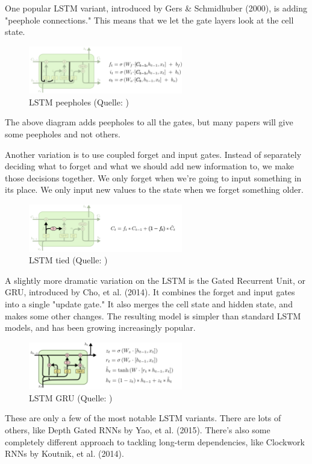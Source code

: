 {One popular LSTM variant, introduced by Gers \& Schmidhuber (2000), is adding "peephole connections." This means that we let the gate layers look at the cell state.
\renewcommand{\figurename}{Abb.}
\begin{figure}[htp]
\centering
\includegraphics[width=0.60\textwidth]{pictures/LSTM3-var-peepholes.png}
\caption[LSTM peepholes]{LSTM peepholes (Quelle: \cite{OlahImg})}
\end{figure}
The above diagram adds peepholes to all the gates, but many papers will give some peepholes and not others.

Another variation is to use coupled forget and input gates. Instead of separately deciding what to forget and what we should add new information to, we make those decisions together. We only forget when we’re going to input something in its place. We only input new values to the state when we forget something older.
\renewcommand{\figurename}{Abb.}
\begin{figure}[htp]
\centering
\includegraphics[width=0.60\textwidth]{pictures/LSTM3-var-tied.png}
\caption[LSTM tied]{LSTM tied (Quelle: \cite{OlahImg})}
\end{figure}
A slightly more dramatic variation on the LSTM is the Gated Recurrent Unit, or GRU, introduced by Cho, et al. (2014). It combines the forget and input gates into a single "update gate." It also merges the cell state and hidden state, and makes some other changes. The resulting model is simpler than standard LSTM models, and has been growing increasingly popular.
\renewcommand{\figurename}{Abb.}
\begin{figure}[htp]
\centering
\includegraphics[width=0.60\textwidth]{pictures/LSTM3-var-GRU.png}
\caption[LSTM GRU]{LSTM GRU (Quelle: \cite{OlahImg})} 
\end{figure}
These are only a few of the most notable LSTM variants. There are lots of others, like Depth Gated RNNs by Yao, et al. (2015). There’s also some completely different approach to tackling long-term dependencies, like Clockwork RNNs by Koutnik, et al. (2014).

}
